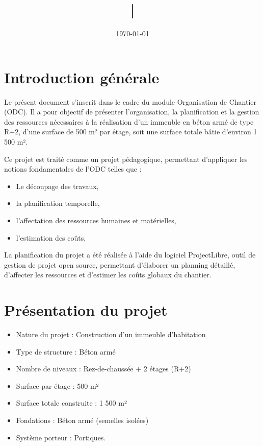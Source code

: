 \documentclass[12pt,a4paper]{article}
\title{|}
\author{}
\date{\today}
\begin{document}
	
	
	\tableofcontents
	
	\newpage
	
	
	
	
	\section{Introduction générale}
	
	Le présent document s’inscrit dans le cadre du module Organisation de Chantier (ODC). Il a pour objectif de présenter l’organisation, la planification et la gestion des ressources nécessaires à la réalisation d’un immeuble en béton armé de type R+2, d’une surface de 500 m² par étage, soit une surface totale bâtie d’environ 1 500 m².
	
	\vspace{\baselineskip}
	
	Ce projet est traité comme un projet pédagogique, permettant d’appliquer les notions fondamentales de l’ODC telles que :
	
	
	\begin{itemize}
		\item Le découpage des travaux,
		\item la planification temporelle,
		\item l’affectation des ressources humaines et matérielles,
		\item l’estimation des coûts,
	\end{itemize}
	
	\vspace{\baselineskip}
	
	La planification du projet a été réalisée à l’aide du logiciel ProjectLibre, outil de gestion de projet open source, permettant d’élaborer un planning détaillé, d’affecter les ressources et d’estimer les coûts globaux du chantier.
	
	
	\section{Présentation du projet}
	
	
	\begin{itemize}
		\item Nature du projet : Construction d’un immeuble d’habitation
		
		\item Type de structure : Béton armé
		
		\item Nombre de niveaux : Rez-de-chaussée + 2 étages (R+2)
		
		\item Surface par étage : 500 m²
		
		\item Surface totale construite : 1 500 m²
		
		\item Fondations : Béton armé (semelles isolées)
		
		\item Système porteur : Portiques.
	\end{itemize}
	
\end{document}
